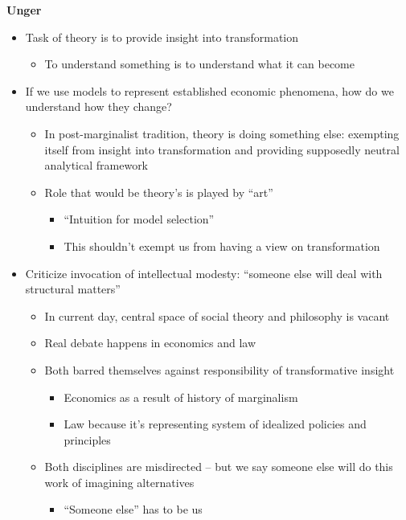 \textbf{Unger}

\begin{itemize}
\tightlist
\item
  Task of theory is to provide insight into transformation

  \begin{itemize}
  \tightlist
  \item
    To understand something is to understand what it can become
  \end{itemize}
\item
  If we use models to represent established economic phenomena, how do
  we understand how they change?

  \begin{itemize}
  \tightlist
  \item
    In post-marginalist tradition, theory is doing something else:
    exempting itself from insight into transformation and providing
    supposedly neutral analytical framework
  \item
    Role that would be theory's is played by ``art''

    \begin{itemize}
    \tightlist
    \item
      ``Intuition for model selection''
    \item
      This shouldn't exempt us from having a view on transformation
    \end{itemize}
  \end{itemize}
\item
  Criticize invocation of intellectual modesty: ``someone else will deal
  with structural matters''

  \begin{itemize}
  \tightlist
  \item
    In current day, central space of social theory and philosophy is
    vacant
  \item
    Real debate happens in economics and law
  \item
    Both barred themselves against responsibility of transformative
    insight

    \begin{itemize}
    \tightlist
    \item
      Economics as a result of history of marginalism
    \item
      Law because it's representing system of idealized policies and
      principles
    \end{itemize}
  \item
    Both disciplines are misdirected -- but we say someone else will do
    this work of imagining alternatives

    \begin{itemize}
    \tightlist
    \item
      ``Someone else'' has to be us
    \end{itemize}
  \end{itemize}
\end{itemize}

